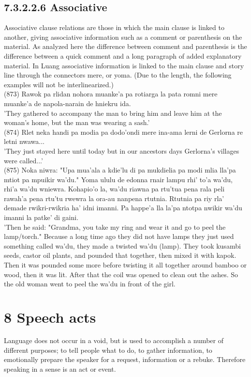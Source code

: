\documentclass[10pt]{article}
\begin{document}
\subsection*{7.3.2.2.6 Associative}
Associative clause relations are those in which the main clause is linked to another, giving associative information such as a comment or parenthesis on the material. As analyzed here the difference between comment and parenthesis is the difference between a quick comment and a long paragraph of added explanatory material. In Luang associative information is linked to the main clause and story line through the connectors mere, or yoma. (Due to the length, the following examples will not be interlinearized.)\\
(873) Rawok pa rlidan nohora muanke'a pa rotiarga la pata romni mere muanke'a de napola-narain de hniekru ida.\\
'They gathered to accompany the man to bring him and leave him at the woman's home, but the man was wearing a sash.'\\
(874) Rlet neka handi pa modia pa dodo'ondi mere ina-ama lerni de Gerlorna re letni nwawa...\\
'They just stayed here until today but in our ancestors days Gerlorna's villages were called...'\\
(875) Noka niwra: "Upa mua'ala a kdie'lu di pa mukdielia pa modi mlia lla'pa mtiot pa mpuikir wa'du." Yoma ululu de edonna rnair lampu rhi' to'a wa'du, rhi'a wa'du wniewra. Kohapio'o la, wa'du riawna pa rtu'tua pena rala peli rawah'a pena rtu'tu rwewra la ora-au nanpena rtutnia. Rtutnia pa riy rla' demade rwikri-rwikria ha' idni imanni. Pa happe'a lla la'pa ntotpa nwikir wa'du imanni la patke' di gaini.\\
'Then he said: "Grandma, you take my ring and wear it and go to peel the lamp/torch." Because a long time ago they did not have lamps they just used something called wa'du, they made a twisted wa'du (lamp). They took kusambi seeds, castor oil plants, and pounded that together, then mixed it with kapok. Then it was pounded some more before twisting it all together around bamboo or wood, then it was lit. After that the coil was opened to clean out the ashes. So the old woman went to peel the wa'du in front of the girl.

\section*{8 Speech acts}
Language does not occur in a void, but is used to accomplish a number of different purposes; to tell people what to do, to gather information, to emotionally prepare the speaker for a request, information or a rebuke. Therefore speaking in a sense is an act or event.
\end{document}
